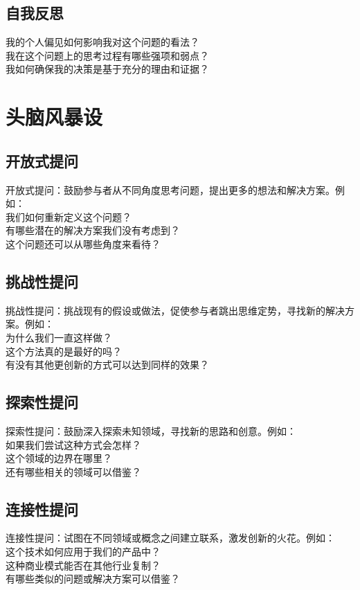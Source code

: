 \documentclass[12pt]{book}
\begin{document}
\subsection{自我反思}
我的个人偏见如何影响我对这个问题的看法？\\
我在这个问题上的思考过程有哪些强项和弱点？\\
我如何确保我的决策是基于充分的理由和证据？\\


\section{头脑风暴设}
\subsection{开放式提问}
开放式提问：鼓励参与者从不同角度思考问题，提出更多的想法和解决方案。例如：\\
我们如何重新定义这个问题？\\
有哪些潜在的解决方案我们没有考虑到？\\
这个问题还可以从哪些角度来看待？\\

\subsection{挑战性提问}
挑战性提问：挑战现有的假设或做法，促使参与者跳出思维定势，寻找新的解决方案。例如：\\
为什么我们一直这样做？\\
这个方法真的是最好的吗？\\
有没有其他更创新的方式可以达到同样的效果？\\

\subsection{探索性提问}
探索性提问：鼓励深入探索未知领域，寻找新的思路和创意。例如：\\
如果我们尝试这种方式会怎样？\\
这个领域的边界在哪里？\\
还有哪些相关的领域可以借鉴？\\
\subsection{连接性提问}
连接性提问：试图在不同领域或概念之间建立联系，激发创新的火花。例如：\\
这个技术如何应用于我们的产品中？\\
这种商业模式能否在其他行业复制？\\
有哪些类似的问题或解决方案可以借鉴？\\
\end{document}
